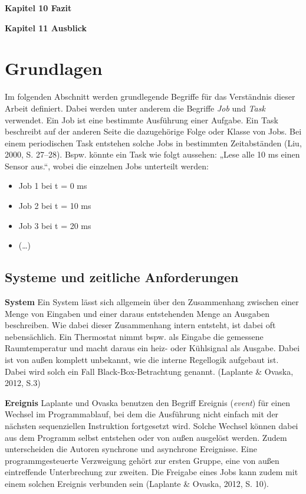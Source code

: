 \textbf{Kapitel 10 Fazit}

\textbf{Kapitel 11 Ausblick}


\chapter{Grundlagen}
Im folgenden Abschnitt werden grundlegende Begriffe für das Verständnis dieser Arbeit definiert. Dabei werden unter anderem die Begriffe \emph{Job} und \emph{Task} verwendet. Ein Job ist eine bestimmte Ausführung einer Aufgabe. Ein Task beschreibt auf der anderen Seite die dazugehörige Folge oder Klasse von Jobs. Bei einem periodischen Task entstehen solche Jobs in bestimmten Zeitabständen (Liu, 2000, S. 27–28). Bspw. könnte ein Task wie folgt aussehen: „Lese alle 10 ms einen Sensor aus.“, wobei die einzelnen Jobs unterteilt werden:

\begin{itemize}
\item Job 1 bei t = 0 ms
\item Job 2 bei t = 10 ms
\item Job 3 bei t = 20 ms
\item (…)
\end{itemize}
\section{Systeme und zeitliche Anforderungen}
\textbf{System} Ein System lässt sich allgemein über den Zusammenhang zwischen einer Menge von Eingaben und einer daraus entstehenden Menge an Ausgaben beschreiben. Wie dabei dieser Zusammenhang intern entsteht, ist dabei oft nebensächlich. Ein Thermostat nimmt bspw. als Eingabe die gemessene Raumtemperatur und macht daraus ein heiz- oder Kühlsignal als Ausgabe. Dabei ist von außen komplett unbekannt, wie die interne Regellogik aufgebaut ist. Dabei wird solch ein Fall Black-Box-Betrachtung genannt. (Laplante \& Ovaska, 2012, S.3)

\textbf{Ereignis }Laplante und Ovaska benutzen den Begriff Ereignis (\emph{event}) für einen Wechsel im Programmablauf, bei dem die Ausführung nicht einfach mit der nächsten sequenziellen Instruktion fortgesetzt wird. Solche Wechsel können dabei aus dem Programm selbst entstehen oder von außen ausgelöst werden. Zudem unterscheiden die Autoren synchrone und asynchrone Ereignisse. Eine programmgesteuerte Verzweigung gehört zur ersten Gruppe, eine von außen eintreffende Unterbrechung zur zweiten. Die Freigabe eines Jobs kann zudem mit einem solchen Ereignis verbunden sein (Laplante \& Ovaska, 2012, S. 10).

